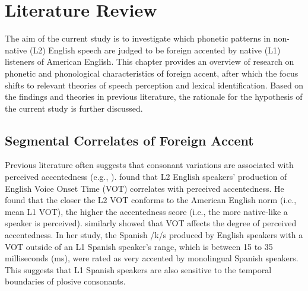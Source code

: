 \chapter{Literature Review}
\label{ch:2}

The aim of the current study is to investigate which phonetic patterns in non-native (L2) English speech are judged to be foreign accented by native (L1) listeners of American English. This chapter provides an overview of research on phonetic and phonological characteristics of foreign accent, after which the focus shifts to relevant theories of speech perception and lexical identification. Based on the findings and theories in previous literature, the rationale for the hypothesis of the current study is further discussed. 

\section{Segmental Correlates of Foreign Accent}

Previous literature often suggests that consonant variations are associated with perceived accentedness (e.g., \citealt{Flege_1994, Magen_1998}). \citet{Major_1987} found that L2 English speakers’ production of English Voice Onset Time (VOT) correlates with perceived accentedness. He found that the closer the L2 VOT conforms to the American English norm (i.e., mean L1 VOT), the higher the accentedness score (i.e., the more native-like a speaker is perceived).  \citet{Gonzalez-Bueno_1997} similarly showed that VOT affects the degree of perceived accentedness. In her study, the Spanish /k/s produced by English speakers with a VOT outside of an L1 Spanish speaker’s range, which is between 15 to 35 milliseconds (ms), were rated as very accented by monolingual Spanish speakers. This suggests that L1 Spanish speakers are also sensitive to the temporal boundaries of plosive consonants. 

